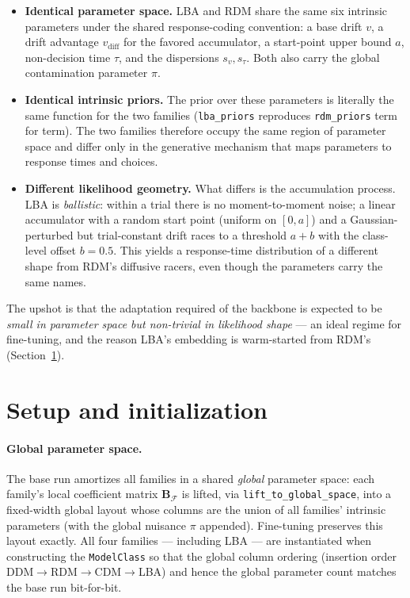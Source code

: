 \documentclass[11pt]{article}
\newcommand{\rmB}{\mathbf{B}}
\newcommand{\clF}{\mathcal{F}}
\begin{document}
\begin{itemize}
  \item \textbf{Identical parameter space.} LBA and RDM share the same six
    intrinsic parameters under the shared response-coding convention: a base
    drift $v$, a drift advantage $v_{\mathrm{diff}}$ for the favored
    accumulator, a start-point upper bound $a$, non-decision time $\tau$, and
    the dispersions $s_v, s_\tau$. Both also carry the global contamination
    parameter $\pi$.
  \item \textbf{Identical intrinsic priors.} The prior over these parameters is
    literally the same function for the two families (\texttt{lba\_priors}
    reproduces \texttt{rdm\_priors} term for term). The two families therefore
    occupy the same region of parameter space and differ only in the generative
    mechanism that maps parameters to response times and choices.
  \item \textbf{Different likelihood geometry.} What differs is the accumulation
    process. LBA is \emph{ballistic}: within a trial there is no moment-to-moment
    noise; a linear accumulator with a random start point (uniform on $[0,a]$)
    and a Gaussian-perturbed but trial-constant drift races to a threshold
    $a + b$ with the class-level offset $b=0.5$. This yields a response-time
    distribution of a different shape from RDM's diffusive racers, even though
    the parameters carry the same names.
\end{itemize}

The upshot is that the adaptation required of the backbone is expected to be
\emph{small in parameter space but non-trivial in likelihood shape} --- an ideal
regime for fine-tuning, and the reason LBA's embedding is warm-started from
RDM's (Section~\ref{sec:setup}).

\section{Setup and initialization}\label{sec:setup}

\paragraph{Global parameter space.}
The base run amortizes all families in a shared \emph{global} parameter space:
each family's local coefficient matrix $\rmB_\clF$ is lifted, via
\texttt{lift\_to\_global\_space}, into a fixed-width global layout whose columns
are the union of all families' intrinsic parameters (with the global nuisance
$\pi$ appended). Fine-tuning preserves this layout exactly. All four families
--- including LBA --- are instantiated when constructing the \texttt{ModelClass}
so that the global column ordering (insertion order
DDM$\to$RDM$\to$CDM$\to$LBA) and hence the global parameter count matches the
base run bit-for-bit.
\end{document}
